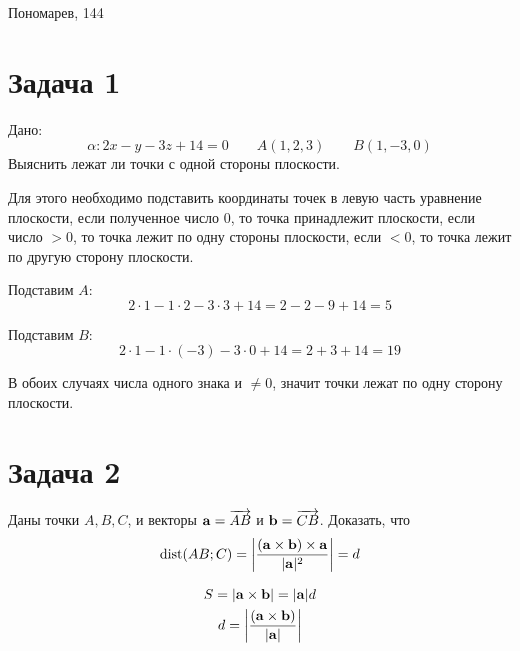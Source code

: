\documentclass[12pt, oneside]{memoir}
\begin{document}
Пономарев, 144
\section*{Задача 1}
Дано:
\[\alpha: 2x-y-3z+14=0 \qquad A(1,2,3) \qquad B(1,-3,0)\]
Выяснить лежат ли точки с одной стороны плоскости.

Для этого необходимо подставить координаты точек в левую часть уравнение плоскости,
если полученное число 0, то точка принадлежит плоскости,
если число $>0$, то точка лежит по одну стороны плоскости,
если $<0$, то точка лежит по другую сторону плоскости.

Подставим $A$:
\[2 \cdot 1 - 1 \cdot 2 - 3 \cdot 3 + 14 = 2 - 2 - 9 + 14 = 5\]

Подставим $B$:
\[2 \cdot 1 - 1 \cdot (-3) - 3 \cdot 0 + 14 = 2 + 3 + 14 = 19\]

В обоих случаях числа одного знака и $\neq 0$, значит точки лежат по одну сторону плоскости.

\section*{Задача 2}
Даны точки $A, B, C$, и векторы $\mathbf{a} = \overrightarrow{AB}$ и $\mathbf{b} = \overrightarrow{CB}$.
Доказать, что \[\operatorname{dist}(AB; C) = \left| \frac{(\mathbf{a} \times \mathbf{b}) \times \mathbf{a}}{|\mathbf{a}|^2} \right| = d\]

\noindent\begin{minipage}{0.45\textwidth}
\end{minipage}
\begin{minipage}{0.45\textwidth}
    \begin{equation}\label{one}
        \begin{gathered}
            S = |\mathbf{a} \times \mathbf{b}| = |\mathbf{a}| d\\
            d =  \left| \frac{(\mathbf{a} \times \mathbf{b})}{|\mathbf{a}|} \right|
        \end{gathered}
    \end{equation}
\end{minipage}
\end{document}
